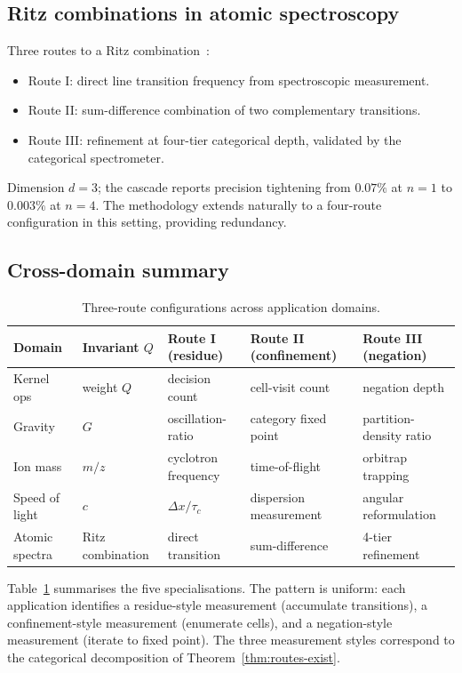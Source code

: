 \documentclass[twocolumn,11pt,a4paper]{article}
\newcommand{\Inv}{Q}
\newcommand{\Depth}{n}
\newcommand{\Dim}{d}
\begin{document}
\subsection{Ritz combinations in atomic spectroscopy}
\label{ssec:spec-ritz}

Three routes to a Ritz combination~\citep{sachikonye2026crs}:
\begin{itemize}[nosep,leftmargin=*]
\item Route I: direct line transition frequency from spectroscopic measurement.
\item Route II: sum-difference combination of two complementary transitions.
\item Route III: refinement at four-tier categorical depth, validated by the categorical spectrometer.
\end{itemize}
Dimension $\Dim = 3$; the cascade reports precision tightening from $0.07\%$ at $\Depth = 1$ to $0.003\%$ at $\Depth = 4$. The methodology extends naturally to a four-route configuration in this setting, providing redundancy.

\subsection{Cross-domain summary}

\begin{table}[t]
\centering
\caption{Three-route configurations across application domains.}
\label{tab:specialisations}
\small
\begin{tabular}{lllll}
\toprule
Domain & Invariant $\Inv$ & Route I (residue) & Route II (confinement) & Route III (negation) \\
\midrule
Kernel ops & weight $Q$ & decision count & cell-visit count & negation depth \\
Gravity & $G$ & oscillation-ratio & category fixed point & partition-density ratio \\
Ion mass & $m/z$ & cyclotron frequency & time-of-flight & orbitrap trapping \\
Speed of light & $c$ & $\Delta x / \tau_c$ & dispersion measurement & angular reformulation \\
Atomic spectra & Ritz combination & direct transition & sum-difference & 4-tier refinement \\
\bottomrule
\end{tabular}
\end{table}

Table~\ref{tab:specialisations} summarises the five specialisations. The pattern is uniform: each application identifies a residue-style measurement (accumulate transitions), a confinement-style measurement (enumerate cells), and a negation-style measurement (iterate to fixed point). The three measurement styles correspond to the categorical decomposition of Theorem~\ref{thm:routes-exist}.
\end{document}
